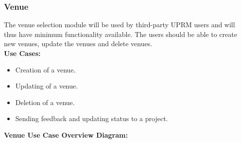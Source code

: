 \subsubsection{Venue}
	The venue selection module will be used by third-party UPRM users and will thus have minimum functionality available. The users should be able to create new venues, update the venues and delete venues.\\
	\textbf{Use Cases:}
	\begin{itemize}
		\item Creation of a venue.
		\item Updating of a venue.
		\item Deletion of a venue.
		\item Sending feedback and updating status to a project.
	\end{itemize}
	\textbf{Venue Use Case Overview Diagram:}\\
	\centerline{}	